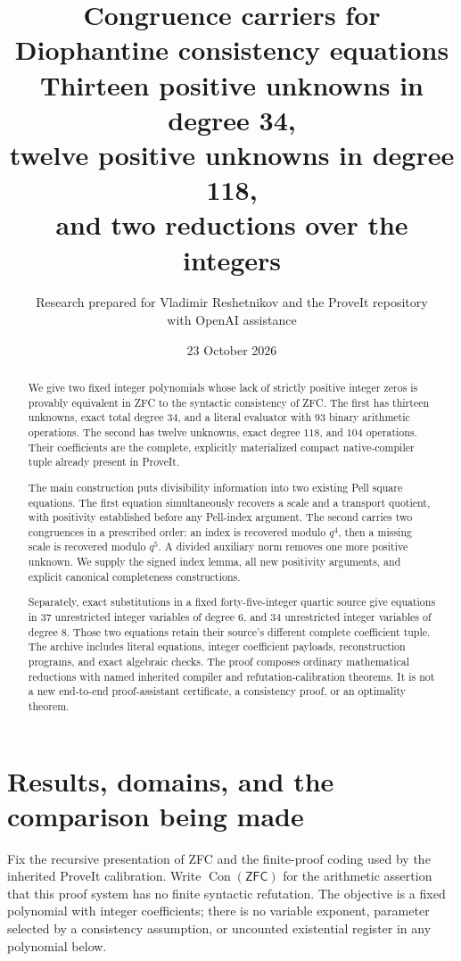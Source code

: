 \documentclass[11pt,a4paper]{article}
\title{\textbf{Congruence carriers for Diophantine consistency equations}\\[5pt]
 \large Thirteen positive unknowns in degree 34,\\
 twelve positive unknowns in degree 118,\\
 and two reductions over the integers}
\author{Research prepared for Vladimir Reshetnikov and the ProveIt repository\\
 \small with OpenAI assistance}
\date{23 October 2026}
\theoremstyle{definition}
\theoremstyle{remark}
\newcommand{\Con}{\operatorname{Con}}
\newcommand{\ZFC}{\mathsf{ZFC}}
\begin{document}
\maketitle
\begin{abstract}
We give two fixed integer polynomials whose lack of strictly positive
integer zeros is provably equivalent in ZFC to the syntactic consistency
of ZFC. The first has thirteen unknowns, exact total degree \(34\), and
a literal evaluator with \(93\) binary arithmetic operations. The second
has twelve unknowns, exact degree \(118\), and \(104\) operations.
Their coefficients are the complete, explicitly materialized compact
native-compiler tuple already present in ProveIt.

The main construction puts divisibility information into two existing
Pell square equations. The first equation simultaneously recovers a
scale and a transport quotient, with positivity established before any
Pell-index argument. The second carries two congruences in a prescribed
order: an index is recovered modulo \(q^4\), then a missing scale is
recovered modulo \(q^5\). A divided auxiliary norm removes one more
positive unknown. We supply the signed index lemma, all new positivity
arguments, and explicit canonical completeness constructions.

Separately, exact substitutions in a fixed forty-five-integer quartic
source give equations in \(37\) unrestricted integer variables of degree
\(6\), and \(34\) unrestricted integer variables of degree \(8\). Those
two equations retain their source's different complete coefficient tuple.
The archive includes literal equations, integer coefficient payloads,
reconstruction programs, and exact algebraic checks. The proof composes
ordinary mathematical reductions with named inherited compiler and
refutation-calibration theorems. It is not a new end-to-end
proof-assistant certificate, a consistency proof, or an optimality theorem.
\end{abstract}
\thispagestyle{empty}
\clearpage
\tableofcontents
\clearpage

\section{Results, domains, and the comparison being made}
\label{sec:results}

Fix the recursive presentation of ZFC and the finite-proof coding used by
the inherited ProveIt calibration. Write \(\Con(\ZFC)\) for the arithmetic
assertion that this proof system has no finite syntactic refutation.
The objective is a fixed polynomial with integer coefficients; there is
no variable exponent, parameter selected by a consistency assumption,
or uncounted existential register in any polynomial below.
\end{document}
